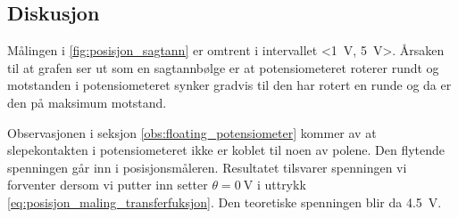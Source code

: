 \subsection{Diskusjon}

Målingen i \autoref{fig:posisjon_sagtann} er omtrent i intervallet <\SI{1}{\volt}, \SI{5}{\volt}>. Årsaken til at grafen ser ut som en sagtannbølge er at potensiometeret roterer rundt og motstanden i potensiometeret synker gradvis til den har rotert en runde og da er den på maksimum motstand.


Observasjonen i seksjon \ref{obs:floating_potensiometer} kommer av at slepekontakten i potensiometeret ikke er koblet til noen av polene. Den flytende spenningen går inn i posisjonsmåleren. Resultatet tilsvarer spenningen vi forventer dersom vi putter inn setter $\theta = \SI{0}{\volt}$ i uttrykk \eqref{eq:posisjon_maling_transferfuksjon}. Den teoretiske spenningen blir da \SI{4.5}{\volt}.

